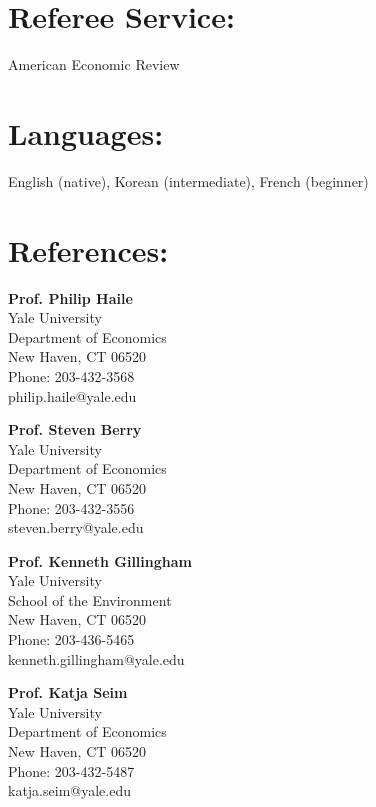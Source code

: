 \documentclass[11pt,letterpaper]{article}
\begin{document}
\section*{Referee Service:}
American Economic Review

\section*{Languages:}
English (native), Korean (intermediate), French (beginner)

\newpage

\section*{References:}

\noindent \textbf{Prof. Philip Haile} \\
Yale University \\
Department of Economics \\
New Haven, CT 06520 \\
Phone: 203-432-3568 \\
philip.haile@yale.edu

\vspace{0.5cm}

\noindent \textbf{Prof. Steven Berry} \\
Yale University \\
Department of Economics \\
New Haven, CT 06520 \\
Phone: 203-432-3556 \\
steven.berry@yale.edu

\vspace{0.5cm}

\noindent \textbf{Prof. Kenneth Gillingham} \\
Yale University \\
School of the Environment \\
New Haven, CT 06520 \\
Phone: 203-436-5465 \\
kenneth.gillingham@yale.edu

\vspace{0.5cm}

\noindent \textbf{Prof. Katja Seim} \\
Yale University \\
Department of Economics \\
New Haven, CT 06520 \\
Phone: 203-432-5487 \\
katja.seim@yale.edu
\end{document}
